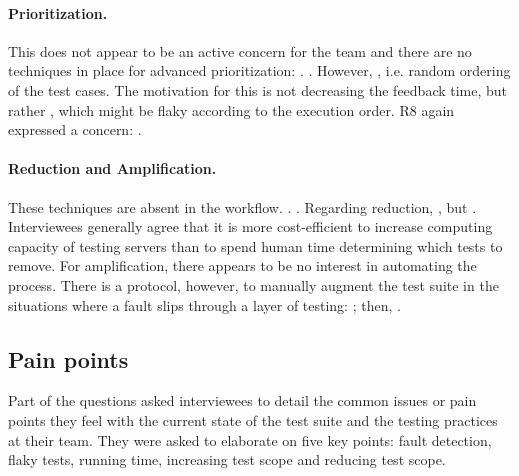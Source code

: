 \paragraph{Prioritization.} This does not appear to be an active concern for the team and there are no techniques in place for advanced prioritization: .
.
However, , i.e. random ordering of the test cases.
The motivation for this is not decreasing the feedback time, but rather , which might be flaky according to the execution order.
R8 again expressed a concern: .

\paragraph{Reduction and Amplification.} These techniques are absent in the workflow. . .
Regarding reduction, , but .
Interviewees generally agree that it is more cost-efficient to increase computing capacity of testing servers than to spend human time determining which tests to remove.
For amplification, there appears to be no interest in automating the process.
There is a protocol, however, to manually augment the test suite in the situations where a fault slips through a layer of testing: ; then, .

\subsection{Pain points}

Part of the questions asked interviewees to detail the common issues or pain points they feel with the current state of the test suite and the testing practices at their team.
They were asked to elaborate on five key points: fault detection, flaky tests, running time, increasing test scope and reducing test scope.

